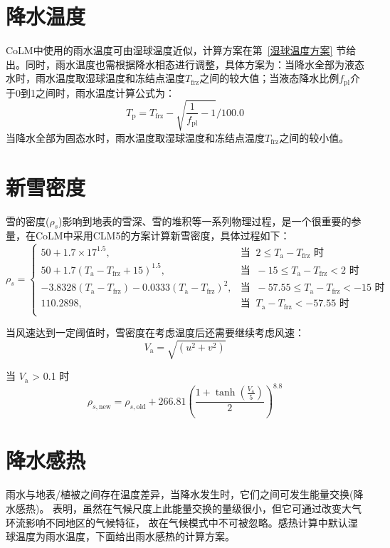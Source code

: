 \section{降水温度}
CoLM中使用的雨水温度可由湿球温度近似，计算方案在第~\ref{湿球温度方案} 节给出。同时，雨水温度也需根据降水相态进行调整，具体方案为：当降水全部为液态水时，雨水温度取湿球温度和冻结点温度$T_{\mathrm{frz}}$之间的较大值；当液态降水比例$f_{\mathrm{pl}}$介于0到1之间时，雨水温度计算公式为：$$T_{\mathrm {p}}=T_{\mathrm{frz}}-\sqrt{\frac{1}{f_{\mathrm{pl}}}-1}/100.0$$
当降水全部为固态水时，雨水温度取湿球温度和冻结点温度$T_{\mathrm{frz}}$之间的较小值。


\section{新雪密度}
雪的密度($\rho_{s}$)影响到地表的雪深、雪的堆积等一系列物理过程，是一个很重要的参量，在CoLM中采用CLM5的方案计算新雪密度，具体过程如下：
\begin{equation*}
  \rho_{s}= \begin{cases}
    50 + 1.7\times 17^{1.5}, & \text{当 }\ 2\leqslant T_{\mathrm {a}} - T_{\mathrm{frz}} \text{ 时}\\
    50 + 1.7(T_{\mathrm {a}} - T_{\mathrm{frz}}+15)^{1.5}, & \text{当 }\ -15\leqslant T_{\mathrm {a}} - T_{\mathrm{frz}} < 2 \text{ 时} \\
    -3.8328(T_{\mathrm {a}} - T_{\mathrm{frz}}) - 0.0333(T_{\mathrm {a}} - T_{\mathrm{frz}})^2, & \text{当 }\ -57.55\leqslant T_{\mathrm {a}} - T_{\mathrm{frz}} < -15 \text{ 时} \\
    110.2898, & \text{当 }\ T_{\mathrm {a}} - T_{\mathrm{frz}} < -57.55 \text{ 时}\\
  \end{cases}
\end{equation*}

当风速达到一定阈值时，雪密度在考虑温度后还需要继续考虑风速：
\begin{equation}
  V_{\mathrm {a}} = \sqrt{(u^2 + v^2)}
\end{equation}

当 $V_{\mathrm {a}}$ > 0.1 时
\begin{equation}
  \rho_{s,\mathrm{new}} = \rho_{s,\mathrm{old}} + 266.81{\left(\frac{1 + \tanh (\frac{V_{\mathrm {a}}}{5})}{2}\right)}^{8.8}
\end{equation}


\section{降水感热}\label{植被地表的雨水感热}
雨水与地表/植被之间存在温度差异，当降水发生时，它们之间可发生能量交换(降水感热)。
\citet{wei2014impact} 表明，虽然在气候尺度上此能量交换的量级很小，但它可通过改变大气环流影响不同地区的气候特征，
故在气候模式中不可被忽略。感热计算中默认湿球温度为雨水温度，下面给出雨水感热的计算方案。

